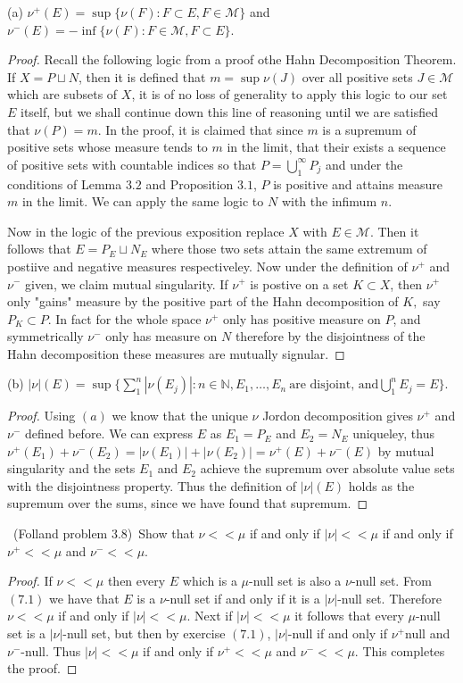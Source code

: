 \documentclass[11pt]{amsart}
\theoremstyle{definition}
\numberwithin{theorem}{section}
\numberwithin{definition}{section}
\numberwithin{equation}{section}
\def\scriptm{{\mathcal M}}
\begin{document}
\noindent (a) $\nu^+(E) = \sup\{\nu(F):F \subset E, F\in\scriptm\}$ and $\nu^-(E) = -\inf\{\nu(F):F \in \scriptm, F \subset E\}$. 
\begin{proof}
Recall the following logic from a proof othe Hahn Decomposition Theorem. If $X = P \sqcup N$, then it is defined that $m = \sup \nu(J)$ over all positive sets $J \in \scriptm$ which are subsets of $X$, it is of no loss of generality to apply this logic to our set $E$ itself, but we shall continue down this line of reasoning until we are satisfied that $\nu(P) = m$. In the proof,  it is claimed that since $m$ is a supremum of positive sets whose measure tends to $m$ in the limit, that their exists a sequence of positive sets with countable indices so that $P = \bigcup_1^\infty P_j$ and under the conditions of Lemma $3.2$ and Proposition $3.1$, $P$ is positive and attains  measure $m$ in the limit. We can apply the same logic to $N$ with the infimum $n$.

Now in the logic of the previous exposition replace $X$ with $E \in \scriptm$. Then it follows that $E = P_E \sqcup N_E$ where those two sets attain the same extremum of postiive and negative measures respectiveley. Now under the definition of $\nu^+$ and $\nu^-$ given, we claim mutual singularity. If $\nu^+$ is postive on a set $K \subset X$, then $\nu^+$ only "gains" measure by the positive part of the Hahn decomposition of $K,$ say $P_K \subset P$. In fact for the whole space $\nu^+$ only has positive measure on $P$, and symmetrically $\nu^-$ only has measure on $N$ therefore by the disjointness of the Hahn decomposition these measures are mutually signular.
\end{proof}
\noindent (b) $|\nu|(E) = \sup\{\sum_1^n |\nu(E_j)| : n \in \mathbb{N}, E_1, \dots, E_n\ \text{are disjoint, and} \bigcup_1^n E_j = E\}.$
\begin{proof}
	Using $(a)$ we know that the unique $\nu$ Jordon decomposition gives $\nu^+$ and $\nu^-$ defined before. We can express $E$ as $E_1 = P_E$ and $E_2 = N_E$ uniqueley, thus $\nu^+(E_1) + \nu^-(E_2) = |\nu(E_1)| + |\nu(E_2)| = \nu^+(E) + \nu^-(E)$ by mutual singularity and the sets $E_1$ and $E_2$ achieve the supremum over absolute value sets with the disjointness property.  Thus the definition of $|\nu|(E)$ holds as the supremum over the sums, since we have found that supremum.
\end{proof}


\medskip {}\ (Folland problem 3.8)\ Show that $\nu << \mu$ if and only if $|\nu| << \mu$ if and only if $\nu^+ << \mu$ and $\nu^- << \mu.$ 
\begin{proof}
	If $\nu << \mu$ then every $E$ which is a $\mu$-null set is also a $\nu$-null set. From $(7.1)$ we have that $E$ is a $\nu$-null set if and only if it is a $|\nu|$-null set. Therefore $\nu << \mu$ if and only if $|\nu| << \mu$. Next if $|\nu| << \mu$ it follows that every $\mu$-null set is a $|\nu|$-null set, but then by exercise $(7.1)$, $|\nu|$-null if and only if $\nu^+$null and $\nu^-$-null. Thus $|\nu| << \mu$ if and only if $\nu^+ << \mu$ and $\nu^- << \mu.$ This completes the proof.
\end{proof}
\end{document}
